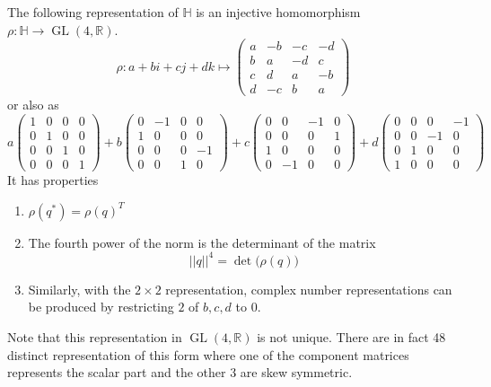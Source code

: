 \documentclass{article}
\DeclareMathOperator{\GL}{GL}
\begin{document}
      \begin{proposition}
      The following representation of $\mathbb{H}$ is an injective homomorphism $\rho: \mathbb{H} \longrightarrow \GL(4, \mathbb{R})$. 
      \[\rho: a+bi+cj+dk \mapsto \begin{pmatrix}
      a&-b&-c&-d \\
      b&a&-d&c\\
      c&d&a&-b\\
      d&-c&b&a
      \end{pmatrix}\]
      or also as
      \[a \begin{pmatrix}
      1 &0 &0 &0 \\
      0& 1&0&0\\
      0&0&1&0\\
      0&0&0&1
      \end{pmatrix} + b \begin{pmatrix}
      0&-1&0&0\\1&0&0&0\\0&0&0&-1\\0&0&1&0
      \end{pmatrix} + c\begin{pmatrix}
      0&0&-1&0\\0&0&0&1\\1&0&0&0\\0&-1&0&0
      \end{pmatrix} + d \begin{pmatrix}
      0&0&0&-1\\0&0&-1&0\\0&1&0&0\\1&0&0&0
      \end{pmatrix}\]
      It has properties
      \begin{enumerate}
          \item $\rho(q^*) = \rho(q)^T$
          \item The fourth power of the norm is the determinant of the matrix 
          \[||q||^4 = \det\big( \rho (q)\big)\]
          \item Similarly, with the $2\times 2$ representation, complex number representations can be produced by restricting $2$ of $b, c, d$ to $0$. 
      \end{enumerate}
      \end{proposition}

      Note that this representation in $\GL(4, \mathbb{R})$ is not unique. There are in fact 48 distinct representation of this form where one of the component matrices represents the scalar part and the other 3 are skew symmetric. 
\end{document}
